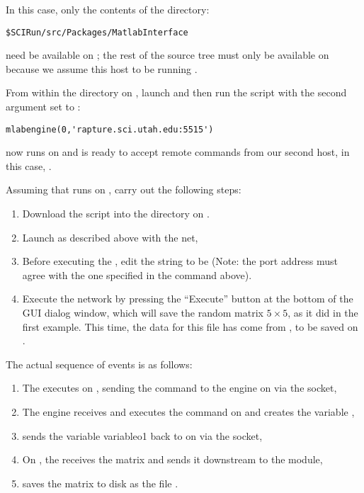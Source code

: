 In this case, only the contents of the directory: 
%
\begin{verbatim}
$SCIRun/src/Packages/MatlabInterface
\end{verbatim}
%
need be available on ; the rest of the \sr{} source tree must
only be available on  because we assume this host to be
running \sr{}.

From within the directory on , launch \m{} and then run the
 script with the second argument set to
:
%
\begin{verbatim}
mlabengine(0,'rapture.sci.utah.edu:5515')
\end{verbatim}
%
\m{} now runs on  and is ready to accept remote commands from
our second host, in this case, .

Assuming that \sr{} runs on , carry out the
following steps:
%
\begin {enumerate}
  \item Download the script  
        into the \sr{} directory on . 
  \item Launch \sr{} as described above with the  
        net,
  \item Before executing the \mlm{}, edit the  
        string to be  (Note: the port address
        must agree with the one specified in the  command
        above).
  \item Execute the network by pressing the ``Execute'' button at 
        the bottom of the \mlm{} GUI dialog window, which will save the
        random matrix $5\times 5$, as it did in the first example.  This
        time, the data for this file has come from , to be
        saved on .
\end{enumerate}

The actual sequence of events is as follows:
%
\begin{enumerate}
  \item The \mlm{} executes on , sending the \m{} 
        command
        to the engine on  via the socket,
  \item The engine receives and executes the command on 
         and creates the variable ,
  \item {} sends the variable  variable{o1} back to \sr{} on
         via the socket,
  \item On , the \mlm{} receives the matrix and 
        sends it downstream to the  module,
  \item {} saves the matrix to disk as the file
        .
\end{enumerate}

